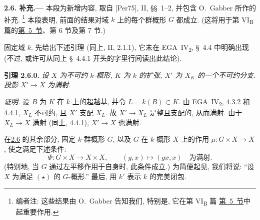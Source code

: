 
\medskip
{}\label{sec:sga3-VIA-2.6}%
\noindent{}\textbf{2.6. 补充.---}
本段为新增内容, 取自 [Per75], II, \S\S~1--2,
并包含 O.~Gabber 所作的补充.%
\footnote{\label{note:sga3-VIA-31}编者注: 这些结果由 O.~Gabber 告知我们,
特别是, 它在第 VI\textsubscript{B} 篇
\hyperref[sec:sga3-VIB-5]{第~5~节}中起重要作用.}
本段表明, 前面的结果对域 \(k\) 上的每个群概形 \(G\) 都成立.
(这将用于第 VI\textsubscript{B} 篇的\hyperref[sec:sga3-VIB-5]{第~5~节}、第 6 节及第 7 节.)

固定域 \(k\). 先给出下述引理 (同上, II, 2.1.1),
它未在 EGA~IV\textsubscript{2}, \S~4.4 中明确出现
(不过, 或许可从同上 \S~4.4.1 开头的字里行间读出此结论).

\medskip
{}\label{lem:sga3-VIA-2.6.0}%
\noindent\textbf{引理 2.6.0.}
\textit{设 \(X\) 为不可约 \(k\)-概形, \(K\) 为 \(k\) 的扩张,
\(X'\) 为 \(X_K\) 的一个不可约分支. 投影 \(X'\to X\) 为满射.}

\noindent\textit{证明.}
设 \(B\) 为 \(K\) 在 \(k\) 上的超越基, 并令 \(L=k(B)\subset K\).
由 EGA~IV\textsubscript{2}, 4.3.2 和 4.4.1,
\(X_L\) 不可约, 且 \(X'\) 支配 \(X_L\).
故 \(X'\to X_L\) 是整且支配的, 从而满射.
由于 \(X_L\to X\) 满射 (同上, 4.4.1), \(X'\to X\) 也满射.

在\hyperref[sga3:vi:paragraph:2-6]{2.6} 的其余部分, 固定 \(k\)-群概形 \(G\),
以及 \(G\) 在 \(k\)-概形 \(X\) 上的作用 \(\mu:G\times X\to X\),
使之满足下述条件:
\[
  \tag{\(\star\)}\label{sga3:vi:lemma:2-6-0:equation:star}
  \Phi:G\times X\longrightarrow X\times X,\qquad
  (g,x)\longmapsto(gx,x)
  \quad\text{为满射.}
\]
(特别地, 当 \(G\) 通过左平移作用于自身时, 此条件成立.)
为简便起见, 我们将说: ``设 \(X\) 为满足 \((\star)\) 的 \(G\)-概形.''
最后, 用 \(k'\) 表示 \(k\) 的完美闭包.

